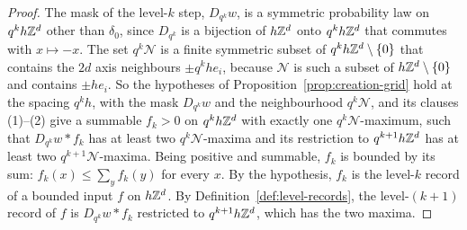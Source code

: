 \begin{proof}
\leanok
{}
The mask of the level-$k$ step, $D_{q^k}w$, is a symmetric probability law on $q^kh\mathbb{Z}^d$ other
than $\delta_0$, since $D_{q^k}$ is a bijection of $h\mathbb{Z}^d$ onto $q^kh\mathbb{Z}^d$ that commutes with
$x \mapsto -x$. The set $q^k\mathcal{N}$ is a finite symmetric subset of $q^kh\mathbb{Z}^d \setminus \{0\}$
that contains the $2d$ axis neighbours $\pm q^khe_i$, because $\mathcal{N}$ is such a subset of
$h\mathbb{Z}^d \setminus \{0\}$ and contains $\pm he_i$. So the hypotheses of
Proposition~\ref{prop:creation-grid} hold at the spacing $q^kh$, with the mask $D_{q^k}w$ and the
neighbourhood $q^k\mathcal{N}$, and its clauses (1)--(2) give a summable $f_k > 0$ on $q^kh\mathbb{Z}^d$
with exactly one $q^k\mathcal{N}$-maximum,
such that $D_{q^k}w * f_k$ has at least two $q^k\mathcal{N}$-maxima and its restriction to
$q^{k+1}h\mathbb{Z}^d$ has at least two $q^{k+1}\mathcal{N}$-maxima. Being positive and summable, $f_k$ is
bounded by its sum: $f_k(x) \le \sum_yf_k(y)$ for every $x$. By the hypothesis, $f_k$ is the
level-$k$ record of a bounded input $f$ on $h\mathbb{Z}^d$. By Definition~\ref{def:level-records}, the
level-$(k+1)$ record of $f$ is $D_{q^k}w * f_k$ restricted to $q^{k+1}h\mathbb{Z}^d$, which has the two
maxima.
\end{proof}

